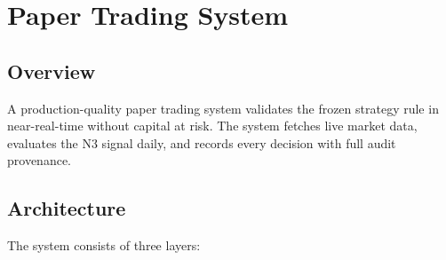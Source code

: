 \documentclass[12pt, a4paper]{article}
\theoremstyle{definition}
\begin{document}
\section{Paper Trading System}
\label{sec:papertrading}

\subsection{Overview}

A production-quality paper trading system validates the frozen strategy rule in
near-real-time without capital at risk.  The system fetches live market data,
evaluates the N3 signal daily, and records every decision with full audit
provenance.

\subsection{Architecture}

The system consists of three layers:
\end{document}
